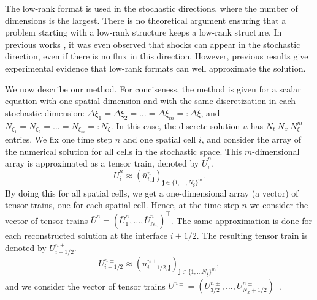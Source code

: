\documentclass{article}
\newcommand{\ibfj}{ {\boldsymbol{j}  } }
\begin{document}
The low-rank format is used in the stochastic directions, where the number of dimensions is the largest. 
There is no theoretical argument ensuring that a problem starting with a low-rank structure keeps a low-rank structure.
In previous works \cite{pares_higher-dimensional_2024,Kolb:2024}, it was even observed that shocks can appear in the stochastic direction, even if there is no flux in this direction. 
However, previous results \cite{walton_tensor-train_2024} give experimental evidence that low-rank formats can well approximate the solution.  

We now describe our method. 
For conciseness, the method is given for a scalar equation with one spatial dimension 
and with the same discretization in each stochastic dimension: 
$\Delta\xi_1=\Delta\xi_2=\dots=\Delta\xi_m=:\Delta\xi$, and 
$N_{\xi_1}=N_{\xi_2}=\dots=N_{\xi_m}=:N_\xi$. 
In this case, the discrete solution $\bar u$ has $N_t~N_x~N_\xi^m$ entries. 
We fix one time step $n$ and one spatial cell $i$, and consider the array of the numerical solution for all cells in the stochastic space. 
This $m$-dimensional array is approximated as a tensor train, denoted by $\bar U_i^n $. 
\begin{equation}
\bar U_i^n  \approx  \left( \bar u_{i,\ibfj}^n  \right)_{\ibfj \in \{1,\dots,N_\xi\}^m}.
\end{equation}
By doing this for all spatial cells, we get a one-dimensional array (a vector) of tensor trains, one for each spatial cell. 
Hence, at the time step $n$ we consider the vector of tensor trains $\bar{U}^n=(\bar{U}_1^n,\dots,\bar{U}_{N_x}^n)^\top$.
The same approximation is done for each reconstructed solution at the interface $i+1/2$. 
The resulting tensor train is denoted by $U_{i+1/2}^{n \pm}$.
\begin{equation}
U_{i+1/2}^{n \pm} \approx \left( u_{i+1/2, \ibfj}^{n \pm} \right)_{\ibfj \in \{1, \dots N_\xi\}^m},
\end{equation}
and we consider the vector of tensor trains 
$U^{n\pm}=(U_{3/2}^{n\pm},\dots,U_{N_x+1/2}^{n\pm})^\top$.

\end{document}
